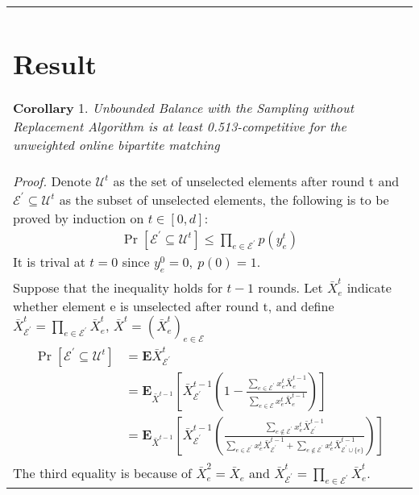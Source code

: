 \documentclass{article}
\begin{document}
\begin{tabular}{l}
\section{Result}
\textbf { Corollary } 1. \textit{Unbounded Balance with the Sampling without Replacement Algorithm is at least 0.513-competitive for the unweighted online bipartite matching}
\\
\textit{Proof.}
Denote $\mathcal{U}^{t}$ as the set of unselected elements after round t and $\mathcal{E}^{\prime} \subseteq \mathcal{U}^{t}$ as the subset of unselected elements, the following is to be proved by induction on $t\in  [0,d]$:
\begin{equation*}
\begin{aligned}
\operatorname{Pr}\left[\mathcal{E}^{\prime} \subseteq \mathcal{U}^{t}\right] \leq \prod_{e \in \mathcal{E}^{\prime}} p\left(y_{e}^{t}\right) 
\end{aligned}
\end{equation*}
It is trival at $t = 0$ since  $y_e^0=0,\ p(0)=1$.
\\
Suppose that the inequality holds for $t -1$ rounds.
Let $\bar{X}_{e}^{t}$ indicate whether element e is unselected after round t, and define $\bar{X}_{\mathcal{E}^{\prime}}^{t}=\prod_{e \in \mathcal{E}^{\prime}} \bar{X}_{e}^{t}$, $\bar{X}^{t} =
\left(\bar{X}_{e}^{t}\right)_{e \in \mathcal{E}}$
\begin{equation*}
\begin{aligned} \operatorname{Pr}\left[\mathcal{E}^{\prime} \subseteq \mathcal{U}^{t}\right] &=\mathbf{E} \bar{X}_{\mathcal{E}^{\prime}}^{t} 
\\
&=\mathbf{E}_{\bar{X}^{t-1}}\left[\bar{X}_{\mathcal{E}^{\prime}}^{t-1}\left(1-\frac{\sum_{e \in \mathcal{E}^{\prime}}  x_{e}^{t} \bar{X}_{e}^{t-1}}{\sum_{e \in \mathcal{E}}  x_{e}^{t} \bar{X}_{e}^{t-1}}\right)\right] 
\\
&=
\mathbf{E}_{\bar{X}^{t-1}}\left[\bar{X}_{\mathcal{E}^{\prime}}^{t-1}\left(\frac{\sum_{e \notin \mathcal{E}^{\prime}}  x_{e}^{t} \bar{X}_{\mathcal{E}^{\prime}}^{t-1}}
{\sum_{e \in \mathcal{E}^{\prime}}  x_{e}^{t} \bar{X}_{\mathcal{E}^{\prime}}^{t-1} 
+
\sum_{e \notin \mathcal{E}^{\prime}}  x_{e}^{t} \bar{X}_{\mathcal{E}^{\prime}\cup \{e\}}^{t-1}
}\right)\right] 
\end{aligned}
\end{equation*}
\\
The third equality is because of $\bar{X}^2_e = \bar{X}_e$ and $\bar{X}_{\mathcal{E}^{\prime}}^{t}=\prod_{e \in \mathcal{E}^{\prime}} \bar{X}_{e}^{t}$.

\end{tabular}
\end{document}
